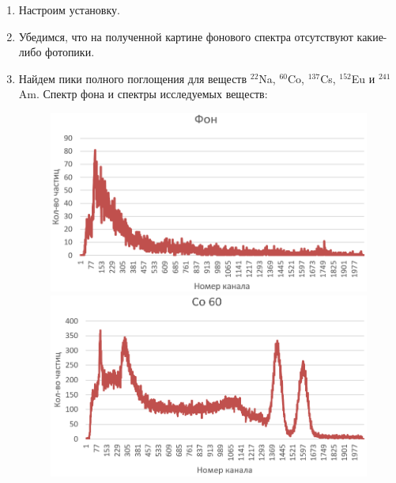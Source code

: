 \documentclass[a4paper, 12pt]{article}%
\begin{document}
\begin{enumerate}

	\item Настроим установку.
	
	\item Убедимся,  что на полученной картине фонового спектра отсутствуют какие-либо фотопики.

	\item	 Найдем пики полного поглощения для веществ $^{22}$Na, $^{60}$Co, $^{137}$Cs, $^{152}$Eu и $^{241}$Am.  Спектр фона и спектры исследуемых веществ:
	 
	\begin{figure}[h!]
	\begin{minipage}[h]{0.47\linewidth}
		\centering
		\includegraphics[scale=0.28]{fon}
	\end{minipage}
	\hfill
	\begin{minipage}[h]{0.47\linewidth}
		\centering
		\includegraphics[scale=0.28]{Co}
	\end{minipage}
\end{figure}


\end{enumerate}
\end{document}
